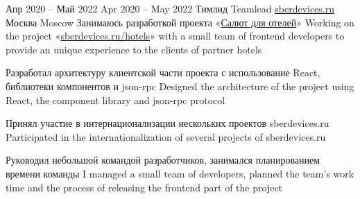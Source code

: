 \cventry
  {\lang
    {Апр 2020 – Май 2022}
    {Apr 2020 – May 2022}}
  {\lang
    {Тимлид}
    {Teamlead}}
  {\href{https://sberdevices.ru}{sberdevices.ru}}
  {\lang
    {Москва}
    {Moscow}}
  {}
  {\lang
    {Занимаюсь разработкой проекта «\href{https://sberdevices.ru/hotels/}{Салют для отелей}»}
    {Working on the project «\href{https://sberdevices.ru/hotels/}{sberdevices.ru/hotels}» with a small team of frontend developers to provide an unique experience to the clients of partner hotels}}

\cvlistitem
  {\lang
    {Разработал архитектуру клиентской части проекта с использование React, библиотеки компонентов и json-rpc}
    {Designed the architecture of the project using React, the component library and json-rpc protocol}}

\cvlistitem
  {\lang
    {Принял участие в интернационализации нескольких проектов sberdevices.ru}
    {Participated in the internationalization of several projects of sberdevices.ru}}

\cvlistitem
  {\lang
    {Руководил небольшой командой разработчиков, занимался планированием времени команды}
    {I managed a small team of developers, planned the team's work time and the process of releasing the frontend part of the project}}
